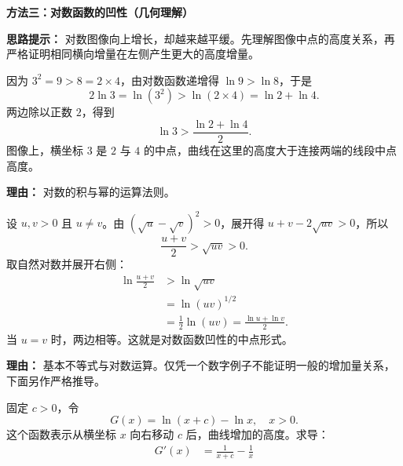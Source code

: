 \begin{proofbox}
\textbf{\textcolor{CProof}{方法三：对数函数的凹性（几何理解）}}

\textbf{思路提示：} 对数图像向上增长，却越来越平缓。先理解图像中点的高度关系，再严格证明相同横向增量在左侧产生更大的高度增量。
\begin{description}[style=nextline, leftmargin=2.8em, labelsep=0.5em, itemsep=0.55em]
\item[\textbf{步骤1（从具体数字理解中点性质）：}] 因为 $3^2=9>8=2\times4$，由对数函数递增得 $\ln9>\ln8$，于是
\[2\ln3=\ln(3^2)>\ln(2\times4)=\ln2+\ln4.\]
两边除以正数 $2$，得到
\[\boxed{\ln3>\frac{\ln2+\ln4}{2}}.\]
图像上，横坐标 $3$ 是 $2$ 与 $4$ 的中点，曲线在这里的高度大于连接两端的线段中点高度。
\begin{center}
\end{center}\par\textbf{理由：} 对数的积与幂的运算法则。
\item[\textbf{步骤2（推广到任意两个正数）：}] 设 $u,v>0$ 且 $u\ne v$。由 $(\sqrt u-\sqrt v)^2>0$，展开得 $u+v-2\sqrt{uv}>0$，所以
\[\frac{u+v}{2}>\sqrt{uv}>0.\]
取自然对数并展开右侧：
\begin{align*}
\ln\frac{u+v}{2}&>\ln\sqrt{uv}\\
&=\ln(uv)^{1/2}\\
&=\frac12\ln(uv)=\frac{\ln u+\ln v}{2}.
\end{align*}
当 $u=v$ 时，两边相等。这就是对数函数凹性的中点形式。\par\textbf{理由：} 基本不等式与对数运算。仅凭一个数字例子不能证明一般的增加量关系，下面另作严格推导。
\item[\textbf{步骤3（证明等长区间的高度增加量递减）：}] 固定 $c>0$，令
\[G(x)=\ln(x+c)-\ln x,\quad x>0.\]
这个函数表示从横坐标 $x$ 向右移动 $c$ 后，曲线增加的高度。求导：
\begin{align*}
G'(x)&=\frac1{x+c}-\frac1x\\

\end{align*}
\end{description}
\end{proofbox}
